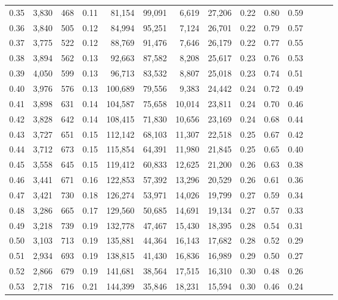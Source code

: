 \begin{tabular}{rrrrrrrrrrrrrr}
0.35 &  3,830 &  468 &  0.11 &   81,154 &   99,091 &   6,619 &  27,206 &  0.22 &  0.80 &      0.59 \\
0.36 &  3,840 &  505 &  0.12 &   84,994 &   95,251 &   7,124 &  26,701 &  0.22 &  0.79 &      0.57 \\
0.37 &  3,775 &  522 &  0.12 &   88,769 &   91,476 &   7,646 &  26,179 &  0.22 &  0.77 &      0.55 \\
0.38 &  3,894 &  562 &  0.13 &   92,663 &   87,582 &   8,208 &  25,617 &  0.23 &  0.76 &      0.53 \\
0.39 &  4,050 &  599 &  0.13 &   96,713 &   83,532 &   8,807 &  25,018 &  0.23 &  0.74 &      0.51 \\
0.40 &  3,976 &  576 &  0.13 &  100,689 &   79,556 &   9,383 &  24,442 &  0.24 &  0.72 &      0.49 \\
0.41 &  3,898 &  631 &  0.14 &  104,587 &   75,658 &  10,014 &  23,811 &  0.24 &  0.70 &      0.46 \\
0.42 &  3,828 &  642 &  0.14 &  108,415 &   71,830 &  10,656 &  23,169 &  0.24 &  0.68 &      0.44 \\
0.43 &  3,727 &  651 &  0.15 &  112,142 &   68,103 &  11,307 &  22,518 &  0.25 &  0.67 &      0.42 \\
0.44 &  3,712 &  673 &  0.15 &  115,854 &   64,391 &  11,980 &  21,845 &  0.25 &  0.65 &      0.40 \\
0.45 &  3,558 &  645 &  0.15 &  119,412 &   60,833 &  12,625 &  21,200 &  0.26 &  0.63 &      0.38 \\
0.46 &  3,441 &  671 &  0.16 &  122,853 &   57,392 &  13,296 &  20,529 &  0.26 &  0.61 &      0.36 \\
0.47 &  3,421 &  730 &  0.18 &  126,274 &   53,971 &  14,026 &  19,799 &  0.27 &  0.59 &      0.34 \\
0.48 &  3,286 &  665 &  0.17 &  129,560 &   50,685 &  14,691 &  19,134 &  0.27 &  0.57 &      0.33 \\
0.49 &  3,218 &  739 &  0.19 &  132,778 &   47,467 &  15,430 &  18,395 &  0.28 &  0.54 &      0.31 \\
0.50 &  3,103 &  713 &  0.19 &  135,881 &   44,364 &  16,143 &  17,682 &  0.28 &  0.52 &      0.29 \\
0.51 &  2,934 &  693 &  0.19 &  138,815 &   41,430 &  16,836 &  16,989 &  0.29 &  0.50 &      0.27 \\
0.52 &  2,866 &  679 &  0.19 &  141,681 &   38,564 &  17,515 &  16,310 &  0.30 &  0.48 &      0.26 \\
0.53 &  2,718 &  716 &  0.21 &  144,399 &   35,846 &  18,231 &  15,594 &  0.30 &  0.46 &      0.24 \\

\end{tabular}
